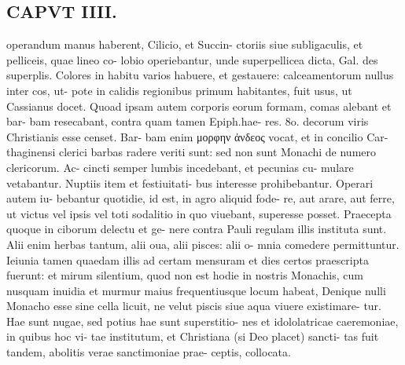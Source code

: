 \documentclass{article}
\begin{document}
\begin{pages}
\section*{CAPVT  IIII. }
\marginpar{[ p.221 ]}operandum manus haberent, Cilicio, et Succin- ctoriis siue subligaculis, et pelliceis, quae lineo co- lobio operiebantur, unde superpellicea dicta, Gal. des superplis. Colores in habitu varios habuere, et gestauere: calceamentorum nullus inter cos, ut- pote in calidis regionibus primum habitantes, fuit usus, ut Cassianus docet. Quoad ipsam autem corporis eorum formam, comas alebant et bar- bam resecabant, contra quam tamen Epiph.hae- res. 8o. decorum viris Christianis esse censet. Bar- bam enim μορφην ἀνδεος vocat, et in concilio Car- thaginensi clerici barbas radere veriti sunt: sed non sunt Monachi de numero clericorum. Ac- cincti semper lumbis incedebant, et pecunias cu- mulare vetabantur. Nuptiis item et festiuitati- bus interesse prohibebantur. Operari autem iu- bebantur quotidie, id est, in agro aliquid fode- re, aut arare, aut ferre, ut victus vel ipsis vel toti sodalitio in quo viuebant, superesse posset. Praecepta quoque in ciborum delectu et ge- nere contra Pauli regulam illis instituta sunt. Alii enim herbas tantum, alii oua, alii pisces: alii o- mnia comedere permittuntur. Ieiunia tamen quaedam illis ad certam mensuram et dies certos praescripta fuerunt: et mirum silentium, quod non est hodie in nostris Monachis, cum nusquam inuidia et murmur maius frequentiusque locum habeat, Denique nulli Monacho esse sine cella licuit, ne velut piscis siue aqua viuere existimare- tur. Hae sunt nugae, sed potius hae sunt superstitio- nes et idololatricae caeremoniae, in quibus hoc vi- tae institutum, et Christiana (si Deo placet) sancti- tas fuit tandem, abolitis verae sanctimoniae prae- ceptis, collocata. 

\end{pages}
\end{document}
